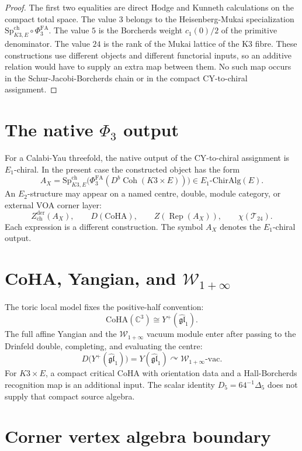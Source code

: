 \documentclass[11pt]{article}
\providecommand{\C}{\mathbb{C}}
\providecommand{\cT}{\mathcal{T}}
\providecommand{\cW}{\mathcal{W}}
\providecommand{\fgl}{\mathfrak{gl}}
\providecommand{\CoHA}{\mathrm{CoHA}}
\providecommand{\ChirAlg}{\mathrm{ChirAlg}}
\providecommand{\SpCh}{\mathrm{Sp}^{\mathrm{ch}}}
\providecommand{\PhiFA}{\Phi^{\mathrm{FA}}}
\begin{document}
\begin{proof}
The first two equalities are direct Hodge and Kunneth calculations on
the compact total space. The value \(3\) belongs to the
Heisenberg-Mukai specialization \(\SpCh_{K3,E}\circ\PhiFA_3\). The
value \(5\) is the Borcherds weight \(c_1(0)/2\) of the primitive
denominator. The value \(24\) is the rank of the Mukai lattice of the
K3 fibre. These constructions use different objects and different
functorial inputs, so an additive relation would have to supply an
extra map between them. No such map occurs in the Schur-Jacobi-Borcherds
chain or in the compact CY-to-chiral assignment.
\end{proof}

\section{The native \texorpdfstring{$\Phi_3$}{Phi3} output}

For a Calabi-Yau threefold, the native output of the CY-to-chiral
assignment is \(E_1\)-chiral. In the present case the constructed
object has the form
\[
  A_X
  =
  \SpCh_{K3,E}\bigl(\PhiFA_3(D^b\operatorname{Coh}(K3\times E))\bigr)
  \in E_1\text{-}\ChirAlg(E).
\]
An \(E_2\)-structure may appear on a named centre, double, module
category, or external VOA corner layer:
\[
  Z^{\mathrm{der}}_{\mathrm{ch}}(A_X),\qquad
  D(\CoHA),\qquad
  Z(\operatorname{Rep}(A_X)),\qquad
  \chi(\cT_{24}).
\]
Each expression is a different construction. The symbol \(A_X\) denotes
the \(E_1\)-chiral output.

\section{CoHA, Yangian, and \texorpdfstring{$\cW_{1+\infty}$}{W1+infty}}

The toric local model fixes the positive-half convention:
\[
  \CoHA(\C^3)\cong Y^+(\widehat{\fgl}_1).
\]
The full affine Yangian and the \(\cW_{1+\infty}\) vacuum module enter
after passing to the Drinfeld double, completing, and evaluating the
centre:
\[
  D\bigl(Y^+(\widehat{\fgl}_1)\bigr)
  =
  Y(\widehat{\fgl}_1)
  \curvearrowright
  \cW_{1+\infty}\text{-vac}.
\]
For \(K3\times E\), a compact critical CoHA with orientation data and a
Hall-Borcherds recognition map is an additional input. The scalar
identity \(D_5=64^{-1}\Delta_5\) does not supply that compact source
algebra.

\section{Corner vertex algebra boundary}
\end{document}
